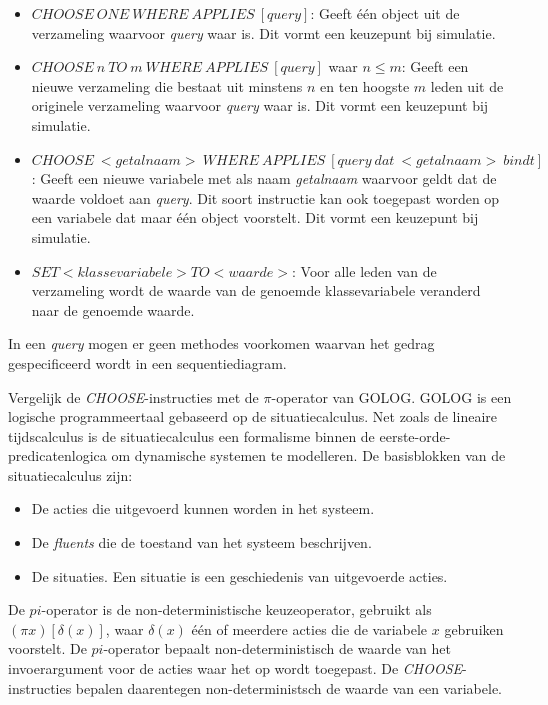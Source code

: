 \begin{itemize}
	\item $CHOOSE\ ONE\ WHERE\ APPLIES\ [query]$: Geeft \'e\'en object uit de verzameling waarvoor \textit{query} waar is. Dit vormt een keuzepunt bij simulatie.
	\item $CHOOSE\ n\ TO\ m\ WHERE\ APPLIES\ [query]$ waar $n \leq m$: Geeft een nieuwe verzameling die bestaat uit minstens $n$ en ten hoogste $m$ leden uit de originele verzameling waarvoor \textit{query} waar is. Dit vormt een keuzepunt bij simulatie.
	\item $CHOOSE\ <getalnaam>\ WHERE\ APPLIES\ [query\ dat\ <getalnaam>\ bindt]$: Geeft een nieuwe variabele met als naam \textit{getalnaam} waarvoor geldt dat de waarde voldoet aan \textit{query}. Dit soort instructie kan ook toegepast worden op een variabele dat maar \'e\'en object voorstelt. Dit vormt een keuzepunt bij simulatie.
	\item $SET <klassevariabele> TO <waarde>$: Voor alle leden van de verzameling wordt de waarde van de genoemde klassevariabele veranderd naar de genoemde waarde.
\end{itemize}

In een \textit{query} mogen er geen methodes voorkomen waarvan het gedrag gespecificeerd wordt in een sequentiediagram.

Vergelijk de \textit{CHOOSE}-instructies met de $\pi$-operator van GOLOG\cite{levesque1997golog}. GOLOG is een logische programmeertaal gebaseerd op de situatiecalculus. Net zoals de lineaire tijdscalculus is de situatiecalculus een formalisme binnen de eerste-orde-predicatenlogica om dynamische systemen te modelleren. De basisblokken van de situatiecalculus zijn:

\begin{itemize}
	\item De acties die uitgevoerd kunnen worden in het systeem.
	\item De \textit{fluents} die de toestand van het systeem beschrijven.
	\item De situaties. Een situatie is een geschiedenis van uitgevoerde acties.
	
\end{itemize}

De $pi$-operator is de non-deterministische keuzeoperator, gebruikt als $(\pi{}x)[\delta{}(x)]$, waar $\delta{}(x)$ \'e\'en of meerdere acties die de variabele $x$ gebruiken voorstelt. De $pi$-operator bepaalt non-deterministisch de waarde van het invoerargument voor de acties waar het op wordt toegepast. De \textit{CHOOSE}-instructies bepalen daarentegen non-deterministsch de waarde van een variabele.


